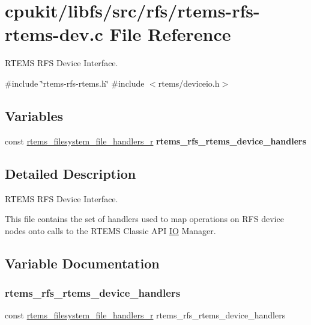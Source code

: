 \hypertarget{rtems-rfs-rtems-dev_8c}{}\section{cpukit/libfs/src/rfs/rtems-\/rfs-\/rtems-\/dev.c File Reference}
\label{rtems-rfs-rtems-dev_8c}


R\+T\+E\+MS R\+FS Device Interface.  


{\ttfamily \#include \char`\"{}rtems-\/rfs-\/rtems.\+h\char`\"{}}\newline
{\ttfamily \#include $<$rtems/deviceio.\+h$>$}\newline
\subsection*{Variables}
\begin{DoxyCompactItemize}
\item 
const \mbox{\hyperlink{struct__rtems__filesystem__file__handlers__r}{rtems\+\_\+filesystem\+\_\+file\+\_\+handlers\+\_\+r}} {\bfseries rtems\+\_\+rfs\+\_\+rtems\+\_\+device\+\_\+handlers}
\end{DoxyCompactItemize}


\subsection{Detailed Description}
R\+T\+E\+MS R\+FS Device Interface. 

This file contains the set of handlers used to map operations on R\+FS device nodes onto calls to the R\+T\+E\+MS Classic A\+PI \mbox{\hyperlink{structIO}{IO}} Manager. 

\subsection{Variable Documentation}
\mbox{\label{rtems-rfs-rtems-dev_8c_adc54e78fa9286c187f9389068eb230e0}} 
\subsubsection{\texorpdfstring{rtems\_rfs\_rtems\_device\_handlers}{rtems\_rfs\_rtems\_device\_handlers}}
{\footnotesize\ttfamily const \mbox{\hyperlink{struct__rtems__filesystem__file__handlers__r}{rtems\+\_\+filesystem\+\_\+file\+\_\+handlers\+\_\+r}} rtems\+\_\+rfs\+\_\+rtems\+\_\+device\+\_\+handlers}

